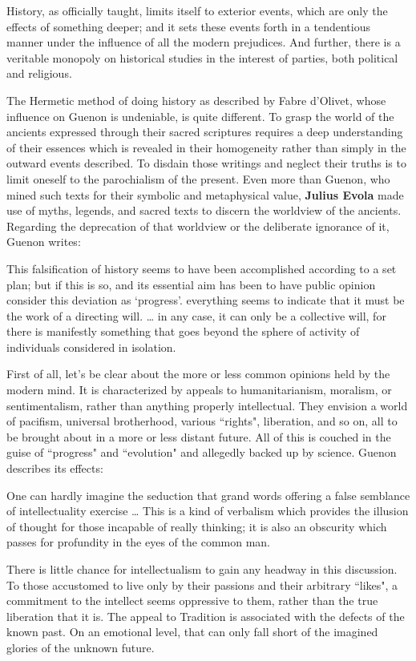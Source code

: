 \begin{quotex}
History, as officially taught, limits itself to exterior events, which are only the effects of something deeper; and it sets these events forth in a tendentious manner under the influence of all the modern prejudices. And further, there is a veritable monopoly on historical studies in the interest of parties, both political and religious. 

\end{quotex}
The Hermetic method of doing history as described by Fabre d'Olivet, whose influence on Guenon is undeniable, is quite different. To grasp the world of the ancients expressed through their sacred scriptures requires a deep understanding of their essences which is revealed in their homogeneity rather than simply in the outward events described. To disdain those writings and neglect their truths is to limit oneself to the parochialism of the present. Even more than Guenon, who mined such texts for their symbolic and metaphysical value, \textbf{Julius Evola} made use of myths, legends, and sacred texts to discern the worldview of the ancients. Regarding the deprecation of that worldview or the deliberate ignorance of it, Guenon writes:

\begin{quotex}
This falsification of history seems to have been accomplished according to a set plan; but if this is so, and its essential aim has been to have public opinion consider this deviation as `progress'. everything seems to indicate that it must be the work of a directing will. … in any case, it can only be a collective will, for there is manifestly something that goes beyond the sphere of activity of individuals considered in isolation. 

\end{quotex}
First of all, let's be clear about the more or less common opinions held by the modern mind. It is characterized by appeals to humanitarianism, moralism, or sentimentalism, rather than anything properly intellectual. They envision a world of pacifism, universal brotherhood, various ``rights", liberation, and so on, all to be brought about in a more or less distant future. All of this is couched in the guise of ``progress" and ``evolution" and allegedly backed up by science. Guenon describes its effects:

\begin{quotex}
One can hardly imagine the seduction that grand words offering a false semblance of intellectuality exercise … This is a kind of verbalism which provides the illusion of thought for those incapable of really thinking; it is also an obscurity which passes for profundity in the eyes of the common man. 

\end{quotex}
There is little chance for intellectualism to gain any headway in this discussion. To those accustomed to live only by their passions and their arbitrary ``likes", a commitment to the intellect seems oppressive to them, rather than the true liberation that it is. The appeal to Tradition is associated with the defects of the known past. On an emotional level, that can only fall short of the imagined glories of the unknown future.

